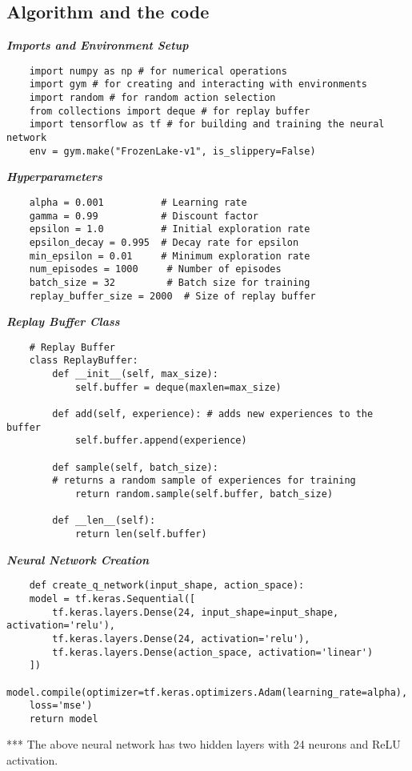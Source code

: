\documentclass{report}
\begin{document}
\subsection*{Algorithm and the code}
\textbf{\textit{Imports and Environment Setup}}
\begin{lstlisting}
    import numpy as np # for numerical operations
    import gym # for creating and interacting with environments
    import random # for random action selection
    from collections import deque # for replay buffer
    import tensorflow as tf # for building and training the neural network
    env = gym.make("FrozenLake-v1", is_slippery=False)
\end{lstlisting}
\textbf{\textit{Hyperparameters}}
\begin{lstlisting}
    alpha = 0.001          # Learning rate
    gamma = 0.99           # Discount factor
    epsilon = 1.0          # Initial exploration rate
    epsilon_decay = 0.995  # Decay rate for epsilon
    min_epsilon = 0.01     # Minimum exploration rate
    num_episodes = 1000     # Number of episodes
    batch_size = 32         # Batch size for training
    replay_buffer_size = 2000  # Size of replay buffer
\end{lstlisting}
\textbf{\textit{Replay Buffer Class}}
\begin{lstlisting}
    # Replay Buffer
    class ReplayBuffer:
        def __init__(self, max_size):
            self.buffer = deque(maxlen=max_size)

        def add(self, experience): # adds new experiences to the buffer
            self.buffer.append(experience)

        def sample(self, batch_size): 
        # returns a random sample of experiences for training
            return random.sample(self.buffer, batch_size)

        def __len__(self):
            return len(self.buffer)
\end{lstlisting}
\textbf{\textit{Neural Network Creation}}
\begin{lstlisting}
    def create_q_network(input_shape, action_space):
    model = tf.keras.Sequential([
        tf.keras.layers.Dense(24, input_shape=input_shape, activation='relu'),
        tf.keras.layers.Dense(24, activation='relu'),
        tf.keras.layers.Dense(action_space, activation='linear')
    ])
    model.compile(optimizer=tf.keras.optimizers.Adam(learning_rate=alpha), 
    loss='mse')
    return model
\end{lstlisting}
\newpage
*** The above neural network has two hidden layers with 24 neurons and ReLU activation.
\end{document}

